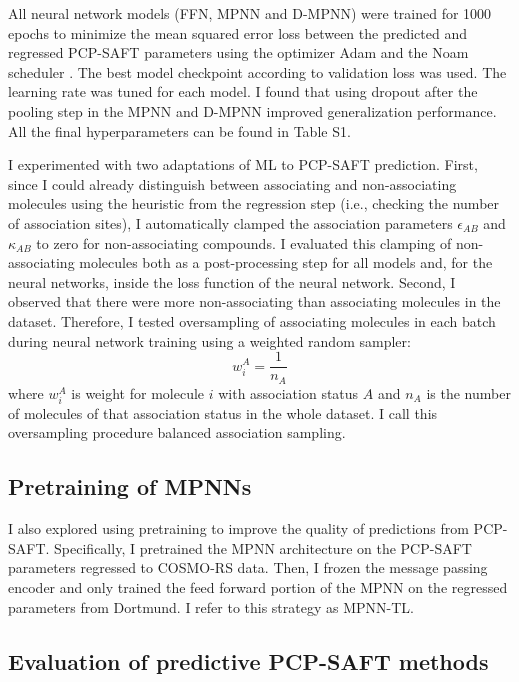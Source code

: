 All neural network models (FFN, MPNN and D-MPNN) were trained for 1000 epochs to minimize the mean squared error loss between the predicted and regressed PCP-SAFT parameters using the optimizer Adam \cite{Kingma2015} and the Noam scheduler \cite{Vaswani2017}. The best model checkpoint according to validation loss was used. The learning rate was tuned for each model. I found that using dropout after the pooling step in the MPNN and D-MPNN improved generalization performance. All the final hyperparameters can be found in Table S1.

I experimented with two adaptations of ML to PCP-SAFT prediction. First, since I could already distinguish between associating and non-associating molecules using the heuristic from the regression step (i.e., checking the number of association sites), I automatically clamped the association parameters $\epsilon_{AB}$ and $\kappa_{AB}$ to zero for non-associating compounds. I evaluated this clamping of non-associating molecules both as a post-processing step for all models and, for the neural networks, inside the loss function of the neural network. Second, I observed that there were more non-associating than associating molecules in the dataset. Therefore, I tested oversampling of associating molecules in each batch during neural network training using a weighted random sampler:
\begin{equation}
    w_i^{A} = \frac{1}{n_A}
\end{equation}
where $w_i^{A}$ is weight for molecule $i$ with association status $A$ and $n_A$ is the number of molecules of that association status in the whole dataset. I call this oversampling procedure balanced association sampling.

\subsection{Pretraining of MPNNs}

I also explored using pretraining to improve the quality of predictions from PCP-SAFT. Specifically, I pretrained the MPNN architecture on the PCP-SAFT parameters regressed to COSMO-RS data. Then, I frozen the message passing encoder and only trained the feed forward portion of the MPNN on the regressed parameters from Dortmund. I refer to this strategy as MPNN-TL.

\subsection{Evaluation of predictive PCP-SAFT methods}

